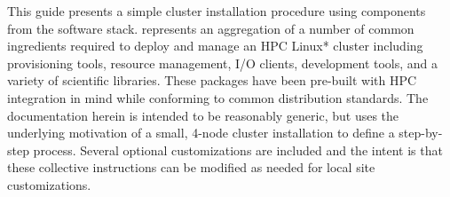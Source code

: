 This guide presents a simple cluster installation procedure using components
from the \OHPC{} software stack. \OHPC{} represents an aggregation of a number
of common ingredients required to deploy and manage an HPC Linux* cluster
including provisioning tools, resource management, I/O clients, development
tools, and a variety of scientific libraries. These packages have been
pre-built with HPC integration in mind while conforming to common \Linux{}
distribution standards.
The documentation herein is intended to
be reasonably generic, but uses the underlying motivation of a small, 4-node
\installmode{} 
cluster installation to define a step-by-step process. Several
optional customizations are included and the intent is that these collective
instructions can be modified as needed for local site customizations.
